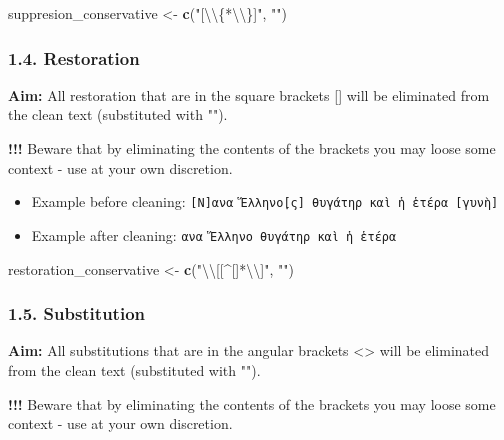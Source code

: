 \documentclass[]{article}
\newenvironment{Shaded}{\begin{snugshade}}{\end{snugshade}}
\newcommand{\CharTok}[1]{\textcolor[rgb]{0.31,0.60,0.02}{#1}}
\newcommand{\KeywordTok}[1]{\textcolor[rgb]{0.13,0.29,0.53}{\textbf{#1}}}
\newcommand{\NormalTok}[1]{#1}
\newcommand{\StringTok}[1]{\textcolor[rgb]{0.31,0.60,0.02}{#1}}
\providecommand{\tightlist}{%
  \setlength{\itemsep}{0pt}\setlength{\parskip}{0pt}}
\begin{document}
\begin{Shaded}
\begin{Highlighting}[]
\NormalTok{suppresion_conservative <-}\StringTok{ }\KeywordTok{c}\NormalTok{(}\StringTok{"[}\CharTok{\textbackslash{}\textbackslash{}}\StringTok{\{*}\CharTok{\textbackslash{}\textbackslash{}}\StringTok{\}]"}\NormalTok{, }\StringTok{""}\NormalTok{)}
\end{Highlighting}
\end{Shaded}

\hypertarget{restoration}{%
\subsubsection{1.4. Restoration}\label{restoration}}

\textbf{Aim:} All restoration that are in the square brackets {[}{]}
will be eliminated from the clean text (substituted with "").

\textbf{!!!} Beware that by eliminating the contents of the brackets you
may loose some context - use at your own discretion.

\begin{itemize}
\tightlist
\item
  Example before cleaning:
  \texttt{{[}Ν{]}ανα\ Ἕλληνο̣{[}ς{]}\ θυγάτηρ\ καὶ\ ἡ\ ἑτέρα\ {[}γυνὴ{]}}
\item
  Example after cleaning: \texttt{ανα\ Ἕλληνο\ θυγάτηρ\ καὶ\ ἡ\ ἑτέρα}
\end{itemize}

\begin{Shaded}
\begin{Highlighting}[]
\NormalTok{restoration_conservative <-}\StringTok{ }\KeywordTok{c}\NormalTok{(}\StringTok{"}\CharTok{\textbackslash{}\textbackslash{}}\StringTok{[[^[]*}\CharTok{\textbackslash{}\textbackslash{}}\StringTok{]"}\NormalTok{, }\StringTok{""}\NormalTok{)}
\end{Highlighting}
\end{Shaded}

\hypertarget{substitution}{%
\subsubsection{1.5. Substitution}\label{substitution}}

\textbf{Aim:} All substitutions that are in the angular brackets
\textless{}\textgreater{} will be eliminated from the clean text
(substituted with "").

\textbf{!!!} Beware that by eliminating the contents of the brackets you
may loose some context - use at your own discretion.
\end{document}

